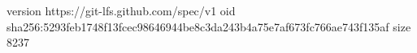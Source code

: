 version https://git-lfs.github.com/spec/v1
oid sha256:5293feb1748f13fcec98646944be8c3da243b4a75e7af673fc766ae743f135af
size 8237
